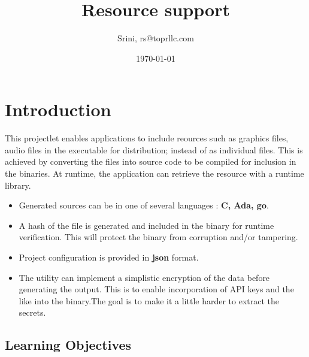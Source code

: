 \documentclass[12pt, a4paper]{article} %
\title{Resource support} %
\author{Srini, rs@toprllc.com}
\date{\small \today} %
\begin{document}

%

\maketitle %

\setcounter{page}{1} %

\section{Introduction} %

This projectlet enables applications to include reources such as graphics files, audio files in the
executable for distribution; instead of as individual files. This is achieved by converting the files into source code to be compiled for inclusion in the binaries. At runtime, the application can retrieve the resource with a runtime library.

\begin{itemize}
    \item Generated sources can be in one of several languages : \textbf{C, Ada, go}.
    \item A hash of the file is generated and included in the binary for runtime verification. This will protect the binary from corruption and/or tampering.
    \item Project configuration is provided in \textbf{json} format.
    \item The utility can implement a simplistic encryption of the data before generating the output. This is to enable incorporation of API keys and the like into the binary.The goal is to make it a little harder to extract the secrets. 
\end{itemize}

\subsection{Learning Objectives}
\end{document}
